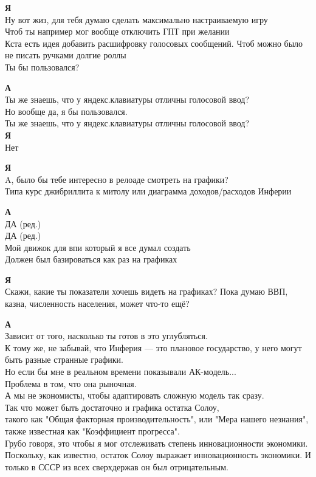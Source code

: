 \textbf{Я} \\
Ну вот жиз, для тебя думаю сделать максимально настраиваемую игру \\
Чтоб ты например мог вообще отключить ГПТ при желании \\
Кста есть идея добавить расшифровку голосовых сообщений. Чтоб можно было не писать ручками долгие роллы \\
Ты бы пользовался?

\textbf{А} \\
Ты же знаешь, что у яндекс.клавиатуры отличны голосовой ввод? \\
Но вообще да, я бы пользовался. \\
Ты же знаешь, что у яндекс.клавиатуры отличны голосовой ввод? \\

\textbf{Я} \\
Нет

\textbf{Я} \\
A, было бы тебе интересно в релоаде смотреть на графики? \\
Типа курс джибриллита к митолу или диаграмма доходов/расходов Инферии

\textbf{А} \\
ДА (ред.) \\
ДА (ред.) \\
Мой движок для впи который я все думал создать \\
Должен был базироваться как раз на графиках

\textbf{Я} \\
Скажи, какие ты показатели хочешь видеть на графиках? Пока думаю ВВП, казна, численность населения, может что-то ещё?

\textbf{А} \\
Зависит от того, насколько ты готов в это углубляться. \\
К тому же, не забывай, что Инферия — это плановое государство, у него могут быть разные странные графики. \\
Но если бы мне в реальном времени показывали АК-модель... \\

Проблема в том, что она рыночная. \\
А мы не экономисты, чтобы адаптировать сложную модель так сразу. \\
Так что может быть достаточно и графика остатка Солоу, \\
такого как "Общая факторная производительность", или "Мера нашего незнания", также известная как "Коэффициент прогресса". \\
Грубо говоря, это чтобы я мог отслеживать степень инновационности экономики. \\
Поскольку, как известно, остаток Солоу выражает инновационность экономики. И только в СССР из всех сверхдержав он был отрицательным.\\

